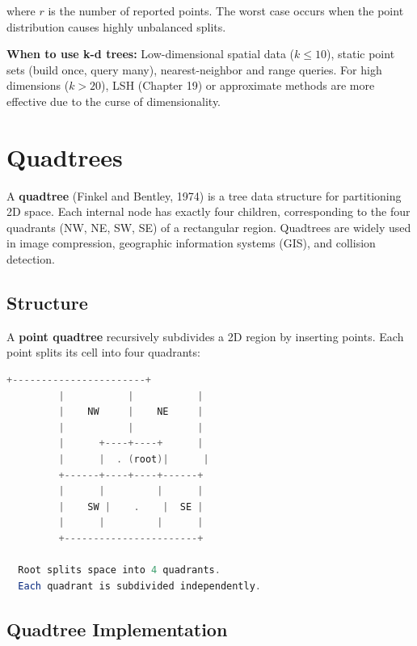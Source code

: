 where $r$ is the number of reported points. The worst case occurs when the point distribution causes highly unbalanced splits.

\textbf{When to use k-d trees:} Low-dimensional spatial data ($k \leq 10$), static point sets (build once, query many), nearest-neighbor and range queries. For high dimensions ($k > 20$), LSH (Chapter 19) or approximate methods are more effective due to the curse of dimensionality.

\section{Quadtrees}

A \textbf{quadtree} (Finkel and Bentley, 1974) is a tree data structure for partitioning 2D space. Each internal node has exactly four children, corresponding to the four quadrants (NW, NE, SW, SE) of a rectangular region. Quadtrees are widely used in image compression, geographic information systems (GIS), and collision detection.

\subsection{Structure}

A \textbf{point quadtree} recursively subdivides a 2D region by inserting points. Each point splits its cell into four quadrants:

\begin{lstlisting}[language=Java]
         +-----------------------+
         |           |           |
         |    NW     |    NE     |
         |           |           |
         |      +----+----+      |
         |      |  . (root)|      |
         +------+----+----+------+
         |      |         |      |
         |    SW |    .    |  SE |
         |      |         |      |
         +-----------------------+

  Root splits space into 4 quadrants.
  Each quadrant is subdivided independently.
\end{lstlisting}

\subsection{Quadtree Implementation}

